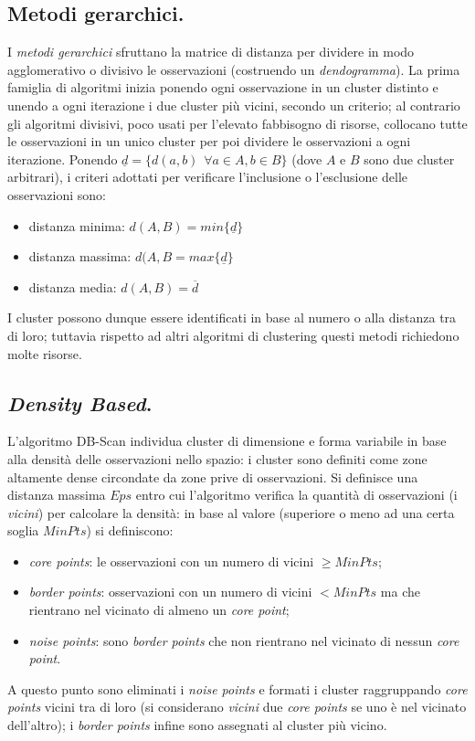 \documentclass[11pt, a4page, twocolumn]{article}
\begin{document}
\subsection{Metodi gerarchici.}
I \textit{metodi gerarchici} sfruttano la matrice di distanza per dividere in modo agglomerativo o divisivo le osservazioni (costruendo un \textit{dendogramma}).
La prima famiglia di algoritmi inizia ponendo ogni osservazione in un cluster distinto e unendo a ogni iterazione i due cluster più vicini, secondo un criterio; al contrario gli algoritmi divisivi, poco usati per l'elevato fabbisogno di risorse, collocano tutte le osservazioni in un unico cluster per poi dividere le osservazioni a ogni iterazione.
Ponendo $\underline{d} = \{ d(a, b) \hspace{5pt} \forall a \in A, b \in B\}$ (dove $A$ e $B$ sono due cluster arbitrari), i criteri adottati per verificare l'inclusione o l'esclusione delle osservazioni sono:
\begin{itemize}
  \item distanza minima: $d(A, B) = min\{ \underline{d} \}$
  \item distanza massima: $d(A, B = max\{ \underline{d} \}$
  \item distanza media: $d(A, B) = \overline{d}$
\end{itemize}
I cluster possono dunque essere identificati in base al numero o alla distanza tra di loro; tuttavia rispetto ad altri algoritmi di clustering questi metodi richiedono molte risorse.


\subsection{\textit{Density Based}.}
L'algoritmo DB-Scan individua cluster di dimensione e forma variabile in base alla densità delle osservazioni nello spazio: i cluster sono definiti come zone altamente dense circondate da zone prive di osservazioni.
Si definisce una distanza massima $Eps$ entro cui l'algoritmo verifica la quantità di osservazioni (i \textit{vicini}) per calcolare la densità: in base al valore (superiore o meno ad una certa soglia $MinPts$) si definiscono:
\begin{itemize}
  \item \textit{core points}: le osservazioni con un numero di vicini $\ge MinPts$;
  \item \textit{border points}: osservazioni con un numero di vicini $< MinPts$ ma che rientrano nel vicinato di almeno un \textit{core point};
  \item \textit{noise points}: sono \textit{border points} che non rientrano nel vicinato di nessun \textit{core point}.
\end{itemize}
A questo punto sono eliminati i \textit{noise points} e formati i cluster raggruppando \textit{core points} vicini tra di loro (si considerano \textit{vicini} due \textit{core points} se uno è nel vicinato dell'altro); i \textit{border points} infine sono assegnati al cluster più vicino.
\end{document}
